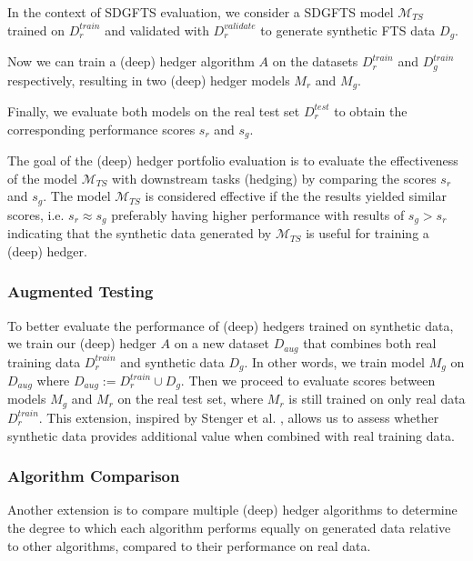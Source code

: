 \documentclass[sigconf]{acmart}
\begin{document}
      In the context of SDGFTS evaluation, we consider a SDGFTS 
      model \( \mathcal{M}_{TS} \) trained on \( D_r^{train} \) 
      and validated with \( D_r^{validate} \) to generate synthetic 
      FTS data \( D_g \).

      Now we can train a (deep) hedger algorithm \( A \) on the 
      datasets \( D_r^{train} \) and \( D_g^{train} \) 
      respectively, resulting in two (deep) hedger models
      \( M_r \) and \( M_g \).

      Finally, we evaluate both models on the real test set 
      \( D_r^{test} \) to obtain the corresponding performance 
      scores \( s_r \) and \( s_g \).

      The goal of the (deep) hedger portfolio evaluation is to 
      evaluate the effectiveness of the model 
      \( \mathcal{M}_{TS} \) with downstream tasks (hedging) 
      by comparing the scores \( s_r \) and \( s_g \). The model 
      \( \mathcal{M}_{TS} \) is considered effective if the 
      the results yielded similar scores, i.e. 
      \( s_r \approx s_g \) \textemdash preferably having higher 
      performance with results of \( s_g > s_r \) \textemdash 
      indicating that the synthetic data generated by 
      \( \mathcal{M}_{TS} \) is useful for training a (deep) hedger.

      \subsubsection{Augmented Testing}
      \label{sec:augmented-testing}
      To better evaluate the performance of (deep) hedgers trained 
      on synthetic data, we train our (deep) hedger \( A \) on a 
      new dataset \( D_{aug} \) that combines both real training 
      data \( D_r^{train} \) and synthetic data \( D_g\). In 
      other words, we train model \( M_g \) on \( D_{aug} \) 
      where \( D_{aug} := D_r^{train} \cup D_g\).
      Then we proceed to evaluate scores between models
      \( M_g \) and \( M_r \) on the real test set, where 
      \( M_r \) is still trained on only real data 
      \( D_r^{train} \).
      This extension, inspired by Stenger et al. \cite{Stenger24}, 
      allows us to assess whether synthetic data provides additional 
      value when combined with real training data.


      \subsubsection{Algorithm Comparison}
      \label{sec:algorithm-comparison}
      Another extension is to compare multiple (deep) hedger 
      algorithms to determine the degree to which each algorithm 
      performs equally on generated data relative to other algorithms, 
      compared to their performance on real data.
\end{document}

